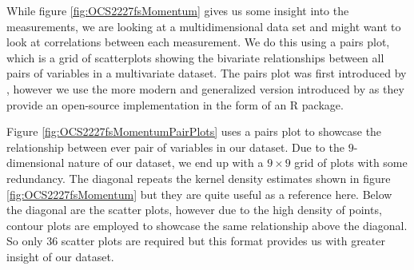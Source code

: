 While figure \ref{fig:OCS2227fsMomentum} gives us some insight into the measurements, we are looking at a multidimensional data set and might want to look at correlations between each measurement. We do this using a pairs plot, which is a grid of scatterplots showing the bivariate relationships between all pairs of variables in a multivariate dataset. The pairs plot was first introduced by \citet{Hartigan75}, however we use the more modern and generalized version introduced by \citet{Emerson13} as they provide an open-source implementation in the form of an R package.

Figure \ref{fig:OCS2227fsMomentumPairPlots} uses a pairs plot to showcase the relationship between ever pair of variables in our dataset. Due to the $9$-dimensional nature of our dataset, we end up with a $9\times9$ grid of plots with some redundancy. The diagonal repeats the kernel density estimates shown in figure \ref{fig:OCS2227fsMomentum} but they are quite useful as a reference here. Below the diagonal are the scatter plots, however due to the high density of points, contour plots are employed to showcase the same relationship above the diagonal. So only 36 scatter plots are required but this format provides us with greater insight of our dataset.

